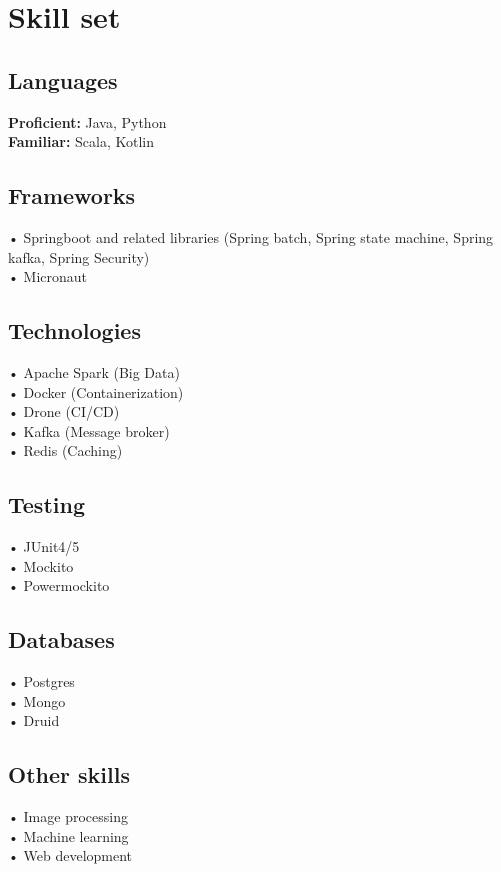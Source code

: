 \documentclass[]{deedy-resume-openfont}
\begin{document}
\begin{minipage}[t]{0.33\textwidth} 


\section{Skill set} 
\subsection{Languages}
\textbf{Proficient:} Java, Python \\
\textbf{Familiar:} Scala, Kotlin
\sectionsep

\subsection{Frameworks}
• Springboot and related libraries (Spring batch, Spring state machine, Spring kafka, Spring Security) \\
• Micronaut
\sectionsep

\subsection{Technologies}
• Apache Spark (Big Data) \\
• Docker (Containerization) \\
• Drone (CI/CD) \\
• Kafka (Message broker) \\
• Redis (Caching)
\sectionsep

\subsection{Testing}
• JUnit4/5 \\
• Mockito \\
• Powermockito
\sectionsep

\subsection{Databases}
• Postgres \\
• Mongo \\
• Druid
\sectionsep

\subsection{Other skills}
• Image processing \\
• Machine learning \\
• Web development
\sectionsep


\end{minipage}
\end{document}
